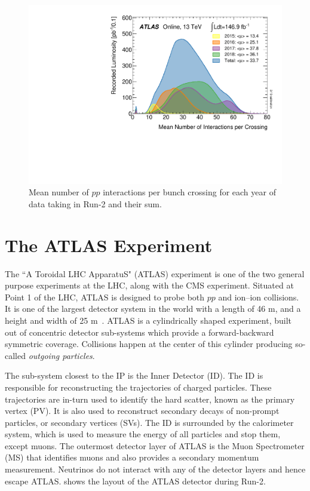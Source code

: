 \begin{figure}[!ht]
    \centering
    \includegraphics[width=0.6\linewidth]{figures/analysis_overview/mu_2015_2018.pdf}
    \caption{Mean number of $pp$ interactions per bunch crossing for each year of data taking in Run-2 and their sum.~\cite{atlas-lumi-pub}}
    \label{fig:pileup}
\end{figure}

\section{The ATLAS Experiment} \label{sec:atlas}

The ``A Toroidal LHC ApparatuS" (ATLAS) experiment is one of the two general purpose experiments at the LHC, along with the CMS experiment. Situated at Point 1 of the LHC, ATLAS is designed to probe both $pp$ and ion--ion collisions. It is one of the largest detector system in the world with a length of 46 m, and a height and width of 25 m~\cite{ATLAS}. ATLAS is a cylindrically shaped experiment, built out of concentric detector sub-systems which provide a forward-backward symmetric coverage. Collisions happen at the center of this cylinder producing so-called \textit{outgoing particles}.

The sub-system closest to the IP is the Inner Detector (ID). The ID is responsible for reconstructing the trajectories of charged particles. These trajectories are in-turn used to identify the hard scatter, known as the primary vertex (PV). It is also used to reconstruct secondary decays of non-prompt particles, or secondary vertices (SVs). The ID is surrounded by the calorimeter system, which is used to measure the energy of all particles and stop them, except muons. The outermost detector layer of ATLAS is the Muon Spectrometer (MS) that identifies muons and also provides a secondary momentum measurement. Neutrinos do not interact with any of the detector layers and hence escape ATLAS. shows the layout of the ATLAS detector during Run-2.

